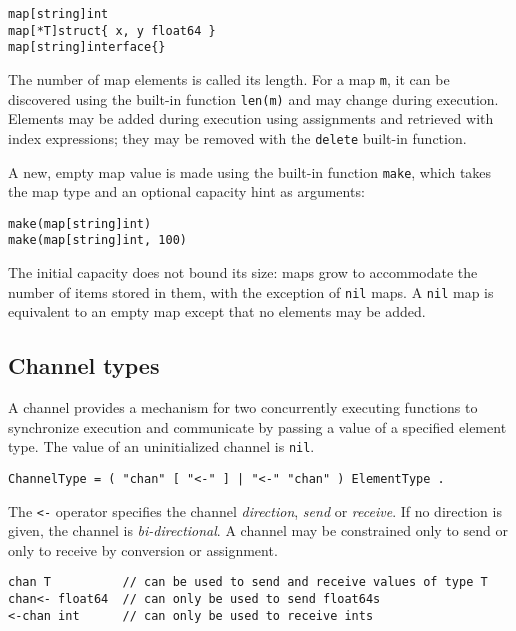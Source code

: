 \begin{Verbatim}[frame=single]
map[string]int
map[*T]struct{ x, y float64 }
map[string]interface{}
\end{Verbatim}

The number of map elements is called its length. For a map \texttt{m},
it can be discovered using the built-in function
\texttt{len(m)} and may change during
execution. Elements may be added during execution using
assignments and retrieved with
index expressions; they may be removed with the
\texttt{delete} built-in
function.

A new, empty map value is made using the built-in function
\texttt{make}, which
takes the map type and an optional capacity hint as arguments:

\begin{Verbatim}[frame=single]
make(map[string]int)
make(map[string]int, 100)
\end{Verbatim}

The initial capacity does not bound its size: maps grow to accommodate
the number of items stored in them, with the exception of \texttt{nil}
maps. A \texttt{nil} map is equivalent to an empty map except that no
elements may be added.

\subsection*{Channel types}

A channel provides a mechanism for two concurrently executing functions
to synchronize execution and communicate by passing a value of a
specified element type. The value of an uninitialized channel is
\texttt{nil}.

\begin{Verbatim}[frame=single]
ChannelType = ( "chan" [ "<-" ] | "<-" "chan" ) ElementType .
\end{Verbatim}

The \texttt{\textless{}-} operator specifies the channel
\emph{direction}, \emph{send} or \emph{receive}. If no direction is
given, the channel is \emph{bi-directional}. A channel may be
constrained only to send or only to receive by
conversion or
assignment.

\begin{Verbatim}[frame=single]
chan T          // can be used to send and receive values of type T
chan<- float64  // can only be used to send float64s
<-chan int      // can only be used to receive ints
\end{Verbatim}


